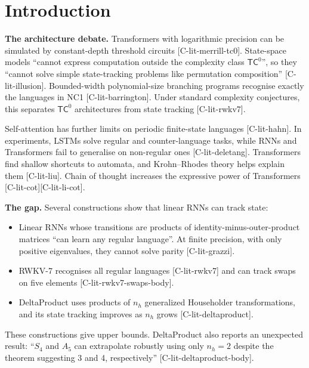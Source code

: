\documentclass[10pt,twocolumn,a4paper]{article}
\providecommand{\tightlist}{\setlength{\itemsep}{0pt}\setlength{\parskip}{0pt}}
\begin{document}
\section{Introduction}\label{introduction}

\textbf{The architecture debate.} Transformers with logarithmic precision can be simulated by constant-depth threshold circuits {[}C-lit-merrill-tc0{]}. State-space models ``cannot express computation outside the complexity class \(\mathsf{TC}^0\)'', so they ``cannot solve simple state-tracking problems like permutation composition'' {[}C-lit-illusion{]}. Bounded-width polynomial-size branching programs recognise exactly the languages in NC1 {[}C-lit-barrington{]}. Under standard complexity conjectures, this separates \(\mathsf{TC}^0\) architectures from state tracking {[}C-lit-rwkv7{]}.

Self-attention has further limits on periodic finite-state languages {[}C-lit-hahn{]}. In experiments, LSTMs solve regular and counter-language tasks, while RNNs and Transformers fail to generalise on non-regular ones {[}C-lit-deletang{]}. Transformers find shallow shortcuts to automata, and Krohn--Rhodes theory helps explain them {[}C-lit-liu{]}. Chain of thought increases the expressive power of Transformers {[}C-lit-cot{]}{[}C-lit-li-cot{]}.

\textbf{The gap.} Several constructions show that linear RNNs can track state:

\begin{itemize}
\tightlist
\item
  Linear RNNs whose transitions are products of identity-minus-outer-product matrices ``can learn any regular language''. At finite precision, with only positive eigenvalues, they cannot solve parity {[}C-lit-grazzi{]}.
\item
  RWKV-7 recognises all regular languages {[}C-lit-rwkv7{]} and can track swaps on five elements {[}C-lit-rwkv7-swaps-body{]}.
\item
  DeltaProduct uses products of \(n_h\) generalized Householder transformations, and its state tracking improves as \(n_h\) grows {[}C-lit-deltaproduct{]}.
\end{itemize}

These constructions give upper bounds. DeltaProduct also reports an unexpected result: ``\(S_4\) and \(A_5\) can extrapolate robustly using only \(n_h = 2\) despite the theorem suggesting 3 and 4, respectively'' {[}C-lit-deltaproduct-body{]}.
\end{document}
